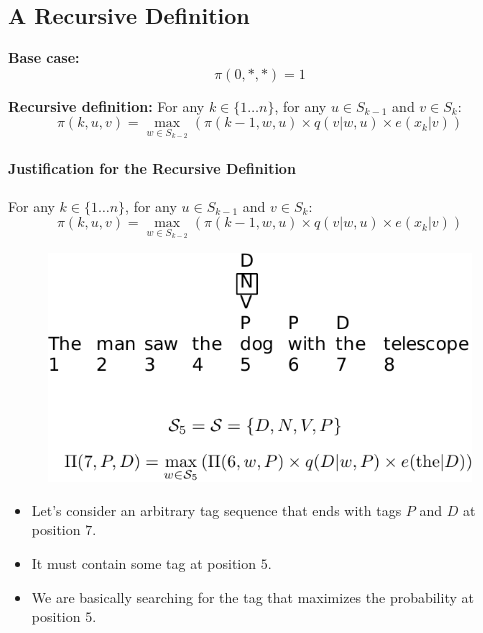 \subsection{A Recursive Definition}
  \textbf{Base case:}
  \[
    \pi(0, *, *) = 1
  \]

  \textbf{Recursive definition:}
  For any $k \in \{1 \ldots n\}$, for any $u \in S_{k-1}$ and $v \in S_k$:
  \[
    \pi(k, u, v) = \max_{w \in S_{k-2}} (\pi(k - 1, w, u) \times q(v|w, u) \times e(x_k|v))
  \]


\paragraph{Justification for the Recursive Definition}
  For any $k \in \{1 \ldots n\}$, for any $u \in S_{k-1}$ and $v \in S_k$:
  \[
    \pi(k, u, v) = \max_{w \in S_{k-2}} (\pi(k - 1, w, u) \times q(v|w, u) \times e(x_k|v))
  \]

  
  \begin{figure}[h]
        	\includegraphics[scale = 0.6]{pics/viterbi2.pdf}
        \end{figure}
        
  \begin{itemize}
   \item Let's consider an arbitrary tag sequence that ends with tags $P$ and $D$ at position $7$.
   \item It must contain some tag at position $5$.
\item We are basically searching for the tag that maximizes the probability at position $5$.
  \end{itemize}
      

